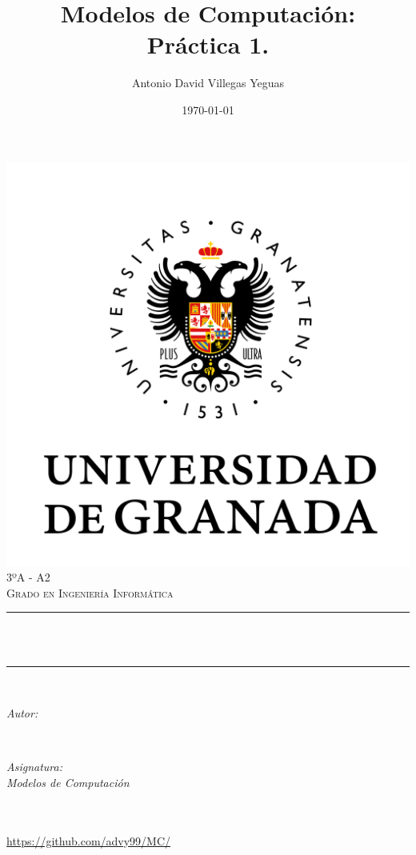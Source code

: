 \documentclass[12pt, spanish]{article}
\title{Modelos de Computación:\\
Práctica 1. \hspace{0.05cm} }
\author{Antonio David Villegas Yeguas}
\date{\today}
\makeatletter
\let\thetitle\@title
\let\theauthor\@author
\let\thedate\@date
\makeatother
\begin{document}

\begin{titlepage}
    \centering
    \vspace*{0.5 cm}
    \includegraphics[scale = 0.50]{ugr.png}\\[1.0 cm]
    \textsc{\large 3ºA - A2}\\[0.5 cm]            
    \textsc{\large Grado en Ingeniería Informática}\\[0.5 cm]              
    \rule{\linewidth}{0.2 mm} \\[0.2 cm]
    { \huge \bfseries \thetitle}\\
    \rule{\linewidth}{0.2 mm} \\[1 cm]
    
    \begin{minipage}{0.4\textwidth}
        \begin{flushleft} \large
            \emph{Autor:}\\
            \theauthor
            \end{flushleft}
            \end{minipage}~
            \begin{minipage}{0.4\textwidth}
            \begin{flushright} \large
            \emph{Asignatura: \\
            Modelos de Computación}                   
        \end{flushright}
    \end{minipage}\\[0.5cm]
  
    {\large \thedate}\\[0.5cm]
    {\url{https://github.com/advy99/MC/}}
    {\doclicenseThis}
 	
    \vfill
    
\end{titlepage}
\end{document}
